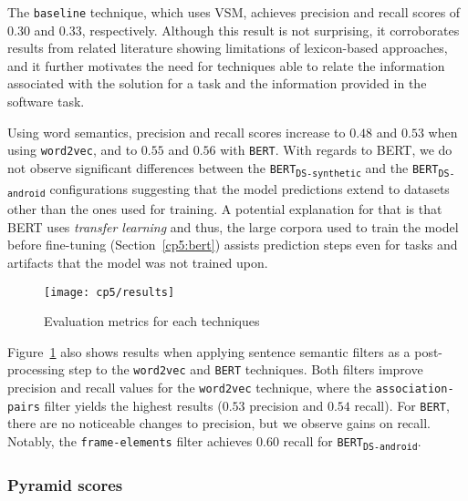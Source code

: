 The \texttt{baseline} technique, which uses VSM, achieves precision and recall scores of $0.30$ and $0.33$, respectively. 
Although this result is not surprising, it corroborates results from related literature showing limitations of lexicon-based approaches, and 
it further motivates the need for techniques able to relate the information associated with the solution for a task and the information provided in the software task.


Using word semantics, precision and recall scores increase to $0.48$ and $0.53$ when using \texttt{word2vec}, and to $0.55$ and $0.56$ with \texttt{BERT}.
With regards to BERT, we do not observe significant differences between the \texttt{BERT\textsubscript{DS-synthetic}}
and the \texttt{BERT\textsubscript{DS-android}} configurations suggesting that the model predictions extend to datasets other than the ones used for training.
A potential explanation for that is that 
BERT uses \textit{transfer learning}  and thus, the  
large corpora used to train the model before fine-tuning (Section~\ref{cp5:bert}) assists prediction steps even for tasks and artifacts that the model was not trained upon.



\clearpage
\begin{landscape}

\begin{figure}
    \centering
    \texttt{[image: cp5/results]}
    \caption{Evaluation metrics for each techniques }
    \label{fig:eval-metrics-results}
\end{figure}
\end{landscape}

\clearpage




Figure~\ref{fig:eval-metrics-results} also shows results when applying sentence semantic filters as
 a post-processing step to the
 \texttt{word2vec} and \texttt{BERT} techniques. 
Both filters improve precision and recall values for the \texttt{word2vec} technique, where the \texttt{association-pairs} filter yields 
the highest results ($0.53$ precision and $0.54$ recall). For \texttt{BERT}, there are no noticeable changes to precision, but 
we observe gains on recall. Notably, the \texttt{frame-elements} filter achieves $0.60$ recall for \texttt{BERT\textsubscript{DS-android}}. 


\subsubsection{Pyramid scores}


